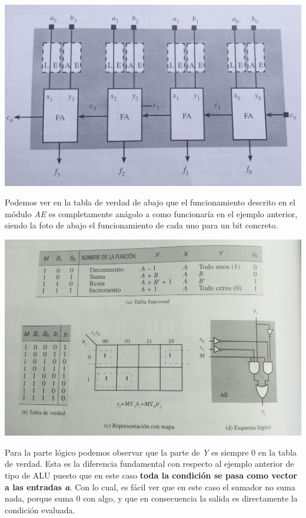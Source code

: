\documentclass[a4paper,10pt]{book}
\begin{document}
\begin{center}
\includegraphics[scale=0.37]{ALU2}
\end{center}

Podemos ver en la tabla de verdad de abajo que el funcionamiento descrito en el módulo \textit{AE} es completamente anágolo a como funcionaría en el ejemplo anterior, siendo la foto de abajo el funcionamiento de cada uno para un bit concreto.

\begin{center}
\includegraphics[scale=0.37]{Ampliador_aritmetico}
\end{center}

Para la parte lógico podemos observar que la parte de \textit{Y} es siempre 0 en la tabla de verdad. Esta es la diferencia fundamental con respecto al ejemplo anterior de tipo de ALU puesto que en este caso \textbf{toda la condición se pasa como vector a las entradas \textit{a}}. Con lo cual, es fácil ver que en este caso el sumador no suma nada, porque suma 0 con algo, y que en consecuencia la salida es directamente la condición evaluada.
\end{document}
